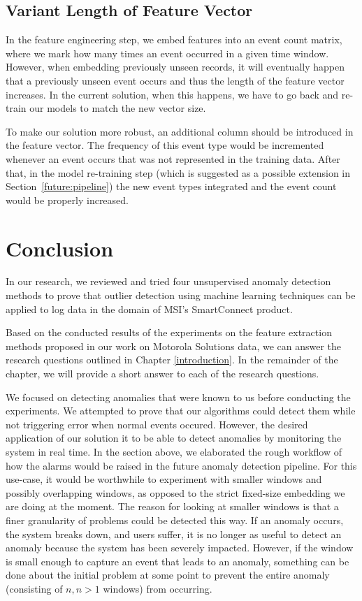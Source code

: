 \subsection{Variant Length of Feature Vector}
In the feature engineering step, we embed features into an event count matrix, where we mark how many times an event occurred in a given time window. However, when embedding previously unseen records, it will eventually happen that a previously unseen event occurs and thus the length of the feature vector increases. In the current solution, when this happens, we have to go back and re-train our models to match the new vector size. 

To make our solution more robust, an additional column should be introduced in the feature vector. The frequency of this event type would be incremented whenever an event occurs that was not represented in the training data. 
After that, in the model re-training step (which is suggested as a possible extension in Section~\ref{future:pipeline}) the new event types integrated and the event count would be properly increased.

\section{Conclusion}

In our research, we reviewed and tried four unsupervised anomaly detection methods to prove that outlier detection using machine learning techniques can be applied to log data in the domain of MSI's SmartConnect product.

Based on the conducted results of the experiments on the feature extraction methods proposed in our work on Motorola Solutions data, we can answer the research questions outlined in Chapter \ref{introduction}. In the remainder of the chapter, we will provide a short answer to each of the research questions.

We focused on detecting anomalies that were known to us before conducting the experiments. We attempted to prove that our algorithms could detect them while not triggering error when normal events occured. However, the desired application of our solution it to be able to detect anomalies by monitoring the system in real time. In the section above, we elaborated the rough workflow of how the alarms would be raised in the future anomaly detection pipeline. For this use-case, it would be worthwhile to experiment with smaller windows and possibly overlapping windows, as opposed to the strict fixed-size embedding we are doing at the moment. The reason for looking at smaller windows is that a finer granularity of problems could be detected this way. If an anomaly occurs, the system breaks down, and users suffer, it is no longer as useful to detect an anomaly because the system has been severely impacted. However, if the window is small enough to capture an event that leads to an anomaly, something can be done about the initial problem at some point to prevent the entire anomaly (consisting of $n, n > 1$ windows) from occurring.\\


